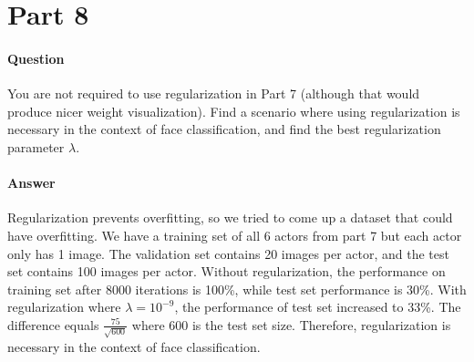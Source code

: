 \documentclass[11pt,twoside]{article}
\begin{document}
\clearpage

\section*{Part 8}
\paragraph{Question}
You are not required to use regularization in Part 7 (although that would produce nicer weight visualization). Find a scenario where using regularization is necessary in the context of face classification, and find the best regularization parameter $\lambda$.

\paragraph{Answer}
Regularization prevents overfitting, so we tried to come up a dataset that could have overfitting. We have a training set of all 6 actors from part 7 but each actor only has 1 image. The validation set contains 20 images per actor, and the test set contains 100 images per actor. Without regularization, the performance on training set after 8000 iterations is 100\%, while test set performance is 30\%. With regularization where $\lambda = 10^{-9}$, the performance of test set increased to 33\%. The difference equals $\frac{75}{\sqrt{600}}$ where 600 is the test set size. Therefore, regularization is necessary in the context of face classification.
\end{document}
